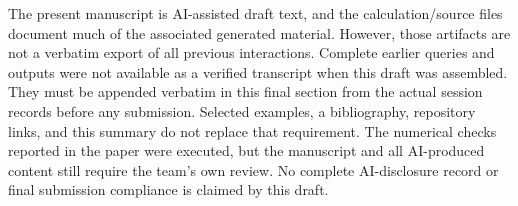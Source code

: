 \documentclass[
  11pt,
  a4paper,
]{article}
\begin{document}
The present manuscript is AI-assisted draft text, and the
calculation/source files document much of the associated generated
material. However, those artifacts are not a verbatim export of all
previous interactions. Complete earlier queries and outputs were not
available as a verified transcript when this draft was assembled. They
must be appended verbatim in this final section from the actual session
records before any submission. Selected examples, a bibliography,
repository links, and this summary do not replace that requirement. The
numerical checks reported in the paper were executed, but the manuscript
and all AI-produced content still require the team's own review. No
complete AI-disclosure record or final submission compliance is claimed
by this draft.
\end{document}
